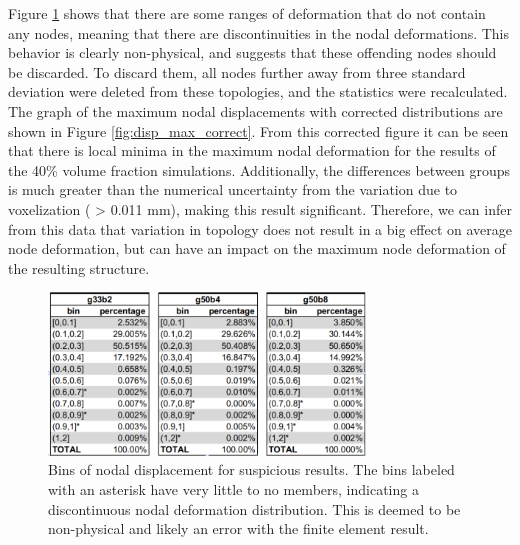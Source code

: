 \documentclass[../main.tex]{subfiles}
\begin{document}
Figure \ref{fig:disp_bins} shows that there are some ranges of deformation that do not contain any nodes, meaning that there are discontinuities in the nodal deformations. This behavior is clearly non-physical, and suggests that these offending nodes should be discarded. To discard them, all nodes further away from three standard deviation were deleted from these topologies, and the statistics were recalculated. The graph of the maximum nodal displacements with corrected distributions are shown in Figure \ref{fig:disp_max_correct}. From this corrected figure it can be seen that there is local minima in the maximum nodal deformation for the results of the 40\% volume fraction simulations. Additionally, the differences between groups is much greater than the numerical uncertainty from the variation due to voxelization ( > 0.011 mm), making this result significant. Therefore, we can infer from this data that variation in topology does not result in a big effect on average node deformation, but can have an impact on the maximum node deformation of the resulting structure.

\begin{figure}[h!]
  \centering
  \includegraphics[width=0.75\textwidth]{images/results/plots/femoral/displacement/bins.png}
  \caption{Bins of nodal displacement for suspicious results. The bins labeled with an asterisk have very little to no members, indicating a discontinuous nodal deformation distribution. This is deemed to be non-physical and likely an error with the finite element result.}
  \label{fig:disp_bins}
\end{figure}
\end{document}
